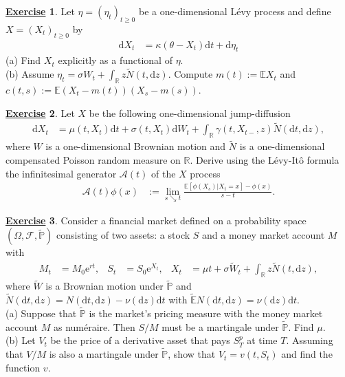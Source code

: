 \documentclass[12pt]{book}
\let\varphi\phi
\numberwithin{equation}{chapter}
\theoremstyle{plain}
\numberwithin{theorem}{section}
\theoremstyle{definition}
\newtheorem{exercise}{\underline{Exercise}}
\numberwithin{exercise}{chapter}
\newcommand{\<}{\langle}
\renewcommand{\>}{\rangle}
\renewcommand{\(}{\left(}
\renewcommand{\)}{\right)}
\renewcommand{\[}{\left[}
\renewcommand{\]}{\right]}
\newcommand\Eb{\mathds{E}}
\newcommand\Pb{\mathds{P}}
\newcommand\Rb{\mathds{R}}
\newcommand\Ac{\mathscr{A}}
\newcommand\Fc{\mathscr{F}}
\newcommand\Om{\Omega}
\newcommand\sig{\sigma}
\newcommand\gam{\gamma}
\newcommand\Ebt{\widetilde{\Eb}}
\newcommand\Pbt{\widetilde{\Pb}}
\newcommand\Wt{\widetilde{W}}
\newcommand\Nt{\widetilde{N}}
\newcommand\dd{\mathrm{d}}
\newcommand\ee{\mathrm{e}}
\begin{document}
\begin{exercise}
\label{exer:10.4}
Let $\eta = (\eta_t)_{t \geq 0}$ be a one-dimensional L\'evy process and define $X = (X_t)_{t \geq 0}$ by
\begin{align}
\dd X_t
	&=	\kappa (\theta - X_t) \dd t + \dd \eta_t
\end{align} 
(a) Find $X_t$ explicitly as a functional of $\eta$.\\
(b) Assume $\eta_t = \sig W_t + \int_\Rb z \Nt(t, \dd z)$.  Compute $m(t) := \Eb X_t$ and $c(t,s) := \Eb (X_t - m(t))(X_s-m(s))$.
\end{exercise}

\begin{exercise}
\label{exer:10.5}
Let $X$ be the following one-dimensional jump-diffusion
\begin{align}
\dd X_t
	&=	\mu(t,X_t) \dd t + \sig(t,X_t) \dd W_t + \int_\Rb \gam(t,X_{t-},z) \Nt(\dd t,\dd z) ,
\end{align}
where $W$ is a one-dimensional Brownian motion and $\Nt$ is a one-dimensional compensated Poisson random measure on $\Rb$.  Derive using the L\'evy-It\^o formula the infinitesimal generator $\Ac(t)$ of the $X$ process
\begin{align}
\Ac(t)\varphi(x)
	&:=	\lim_{s \searrow t} \frac{\Eb[ \varphi(X_s)| X_t = x] - \varphi(x)}{s-t} .
\end{align}
\end{exercise}

\begin{exercise}
\label{exer:10.6}
Consider a financial market defined on a probability space $(\Om,\Fc,\Pbt)$ consisting of two assets: a stock $S$ and a money market account $M$ with
\begin{align}
M_t
	&= M_0 \ee^{r t} , &
S_t
	&=	S_0 \ee^{X_t} , &
X_t
	&=	\mu t + \sig \Wt_t + \int_\Rb z \Nt(t, \dd z) ,
\end{align}
where $\Wt$ is a Brownian motion under $\Pbt$ and $\Nt(\dd t, \dd z) = N(\dd t, \dd z) - \nu( \dd z) \dd t$ with $\Ebt N(\dd t, \dd z) = \nu(\dd z) \dd t$.\\
(a) Suppose that $\Pbt$ is the market's pricing measure with the money market account $M$ as num\'eraire.  Then $S/M$ must be a martingale under $\Pbt$.  Find $\mu$. \\
(b) Let $V_t$ be the price of a derivative asset that pays $S_T^p$ at time $T$.  Assuming that $V/M$ is also a martingale under $\Pbt$, show that $V_t = v(t,S_t)$ and find the function $v$.
\end{exercise}
\end{document}
